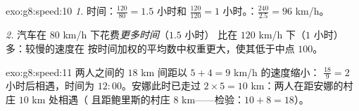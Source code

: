 \begin{solution}{exo:g8:speed:10}
\emph{1.} 时间：$\frac{120}{80} = 1.5$ 小时和 $\frac{120}{120} = 1$
小时。：$\frac{240}{2.5} = 96$ km/h。

\emph{2.} 汽车在 $80$ km/h 下花费\emph{更多时间}（$1.5$ 小时）
比在 $120$ km/h 下（$1$ 小时）多：较慢的速度在
按时间加权的平均数中权重更大，使其低于中点 $100$。
\end{solution}

\begin{solution}{exo:g8:speed:11}
两人之间的 $18$ km 间距以 $5 + 4 = 9$ km/h 的速度缩小：
$\frac{18}{9} = 2$ 小时后相遇，时间为 $12{:}00$。安娜此时已走过
$2 \times 5 = 10$ km：两人在距安娜的村庄 $10$ km 处相遇（
且距鲍里斯的村庄 $8$ km——检验：$10 + 8 = 18$）。
\end{solution}

